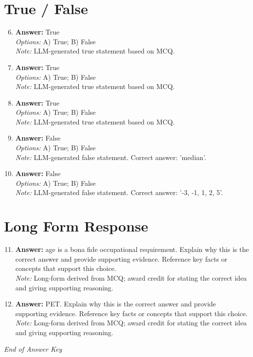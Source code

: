 \documentclass[12pt]{article}
\begin{document}
\section*{True / False}
\begin{enumerate}[label=\arabic*.]
\setcounter{enumi}{5}
\item \textbf{Answer:} True
\\ \textit{Options:} A) True; B) False
\\ \textit{Note:} LLM-generated true statement based on MCQ.
\item \textbf{Answer:} True
\\ \textit{Options:} A) True; B) False
\\ \textit{Note:} LLM-generated true statement based on MCQ.
\item \textbf{Answer:} True
\\ \textit{Options:} A) True; B) False
\\ \textit{Note:} LLM-generated true statement based on MCQ.
\item \textbf{Answer:} False
\\ \textit{Options:} A) True; B) False
\\ \textit{Note:} LLM-generated false statement. Correct answer: 'median'.
\item \textbf{Answer:} False
\\ \textit{Options:} A) True; B) False
\\ \textit{Note:} LLM-generated false statement. Correct answer: '-3, -1, 1, 2, 5'.
\end{enumerate}

\section*{Long Form Response}
\begin{enumerate}[label=\arabic*.]
\setcounter{enumi}{10}
\item \textbf{Answer:} age is a bona fide occupational requirement. Explain why this is the correct answer and provide supporting evidence. Reference key facts or concepts that support this choice.
\\ \textit{Note:} Long-form derived from MCQ; award credit for stating the correct idea and giving supporting reasoning.
\item \textbf{Answer:} PET. Explain why this is the correct answer and provide supporting evidence. Reference key facts or concepts that support this choice.
\\ \textit{Note:} Long-form derived from MCQ; award credit for stating the correct idea and giving supporting reasoning.
\end{enumerate}

\vfill
\noindent\textit{End of Answer Key}
\end{document}
